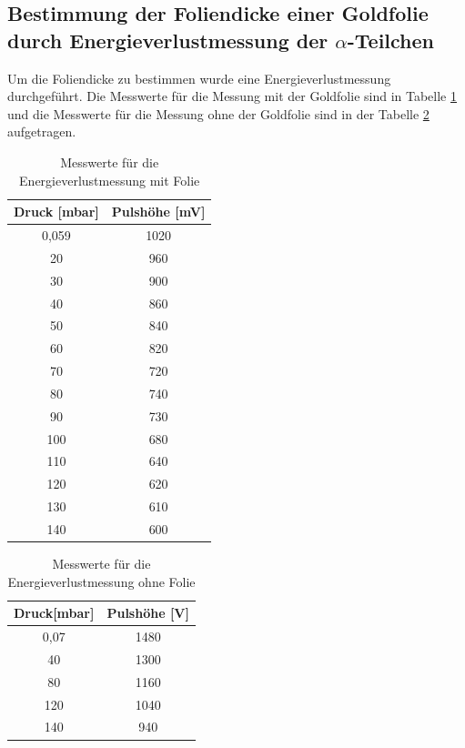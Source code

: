 \subsection{\texorpdfstring{Bestimmung der Foliendicke einer Goldfolie durch Energieverlustmessung der $\alpha$-Teilchen}{Bestimmung der Foliendicke einer Goldfolie durch Energieverlustmessung der alpha-Teilchen}}
Um die Foliendicke zu bestimmen wurde eine Energieverlustmessung durchgeführt. Die Messwerte für die Messung mit der Goldfolie sind in Tabelle \ref{tab:mit} und die Messwerte für die Messung ohne der Goldfolie sind in der Tabelle \ref{tab:ohne} aufgetragen.
\begin{table}[H]
	\centering
	\begin{tabular}{c|c}

		Druck  [mbar]& Pulshöhe [mV] \\
		\hline
0,059	&1020 \\
20	&960 \\
30	&900\\
40	&860\\
50	&840\\
60	&820\\
70	&720\\
80	&740\\
90	&730\\
100	&680\\
110	&640\\
120	&620\\
130	&610\\
140	&600\\

	\end{tabular}
	\caption{Messwerte für die Energieverlustmessung mit Folie }
	  \label{tab:mit}
\end{table}

\begin{table}[H]
	\centering
	\begin{tabular}{c|c}

	Druck[mbar] & Pulshöhe  [V] \\
		\hline
0,07	& 1480\\
40	& 1300\\
80	& 1160\\
120	& 1040\\
140	& 940\\

	\end{tabular}
	\caption{Messwerte für die Energieverlustmessung ohne Folie }
	\label{tab:ohne}
\end{table}

